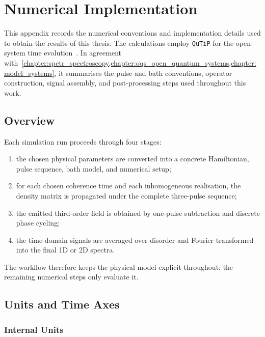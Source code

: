 \chapter{Numerical Implementation}
\label{app:numerical_implementation}

This appendix records the numerical conventions and implementation details used
to obtain the results of this thesis. The calculations employ \texttt{QuTiP}
for the open-system time evolution~\cite{lambertetal2026qutip5quantum}. In
agreement with~\cref{chapter:spctr_spectroscopy,chapter:oqs_open_quantum_systems,chapter:model_systems},
it summarises the pulse and bath conventions, operator construction, signal
assembly, and post-processing steps used throughout this work.

\section{Overview}
\label{app:sec:software_architecture}

Each simulation run proceeds through four stages:
\begin{enumerate}
    \item the chosen physical parameters are converted into a concrete
    Hamiltonian, pulse sequence, bath model, and numerical setup;
    \item for each chosen coherence time and each inhomogeneous realisation,
    the density matrix is propagated under the complete three-pulse sequence;
    \item the emitted third-order field is obtained by one-pulse subtraction
    and discrete phase cycling;
    \item the time-domain signals are averaged over disorder and Fourier
    transformed into the final 1D or 2D spectra.
\end{enumerate}

The workflow therefore keeps the physical model explicit throughout; the
remaining numerical steps only evaluate it.

\section{Units and Time Axes}
\label{app:sec:configuration_workflow}

\subsection{Internal Units}

